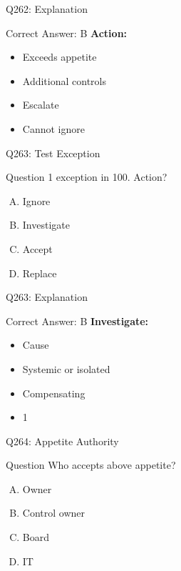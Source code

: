 \documentclass{beamer}
\begin{document}
	\begin{frame}{Q262: Explanation}
		\begin{block}{Correct Answer: B}
			\textbf{Action:}
			\begin{itemize}
				\item Exceeds appetite
				\item Additional controls
				\item Escalate
				\item Cannot ignore
			\end{itemize}
		\end{block}
	\end{frame}
	
	\begin{frame}{Q263: Test Exception}
		\begin{block}{Question}
			1 exception in 100. Action?
		\end{block}
		\begin{enumerate}[(A)]
			\item Ignore
			\item Investigate
			\item Accept
			\item Replace
		\end{enumerate}
	\end{frame}
	
	\begin{frame}{Q263: Explanation}
		\begin{block}{Correct Answer: B}
			\textbf{Investigate:}
			\begin{itemize}
				\item Cause
				\item Systemic or isolated
				\item Compensating
				\item 1%
			\end{itemize}
		\end{block}
	\end{frame}
	
	\begin{frame}{Q264: Appetite Authority}
		\begin{block}{Question}
			Who accepts above appetite?
		\end{block}
		\begin{enumerate}[(A)]
			\item Owner
			\item Control owner
			\item Board
			\item IT
		\end{enumerate}
	\end{frame}
	
\end{document}
